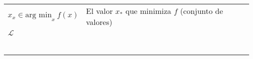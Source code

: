 \begin{table}[ht!]
\begin{center}
\begin{tabularx}{\textwidth}{|l|X|}
            ${x}_x \in \text{arg min}_{x}~f(x) $                                                                                 & El valor $x_{*}$ que minimiza $f$ (conjunto de valores)                                                                                                                     \\
            $\mathcal{L}$                                                                                                        &                                                                                                                                                                             \\
                                                                                                                                 &                                                                                                                                                                             \\
                                                                                                                                 &                                                                                                                                                                             \\
                                                                                                                                 &                                                                                                                                                                             \\
                                                                                                                                 &                                                                                                                                                                             \\
                                                                                                                                 &                                                                                                                                                                             \\
                                                                                                                                 &                                                                                                                                                                             \\

\end{tabularx}
\end{center}
\end{table}
